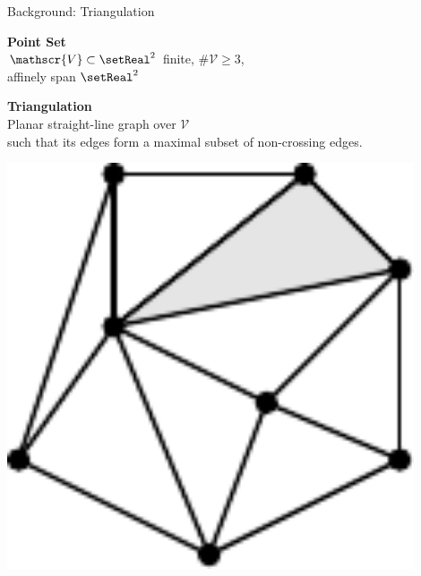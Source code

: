 \documentclass[aspectratio=169]{beamer}
\begin{document}
\begin{frame}{Background: Triangulation}
  \begin{minipage}[c]{0.45\textwidth}
    \textbf{Point Set}\\
    $\mathscr{V}\subset\setReal^2$ finite, $\#\mathscr{V}\geq 3$, \\
    affinely span $\setReal^2$

    \bigskip

    \textbf{Triangulation}\\
    Planar straight-line graph over $\mathscr{V}$ \\
    such that its edges form a maximal subset of non-crossing edges.

    \bigskip

  \end{minipage}
  \hfill
  \begin{minipage}[c]{0.49\textwidth}
    \includegraphics[width=0.9\textwidth]{figures/triangulation.pdf}
  \end{minipage}
\end{frame}
\end{document}
